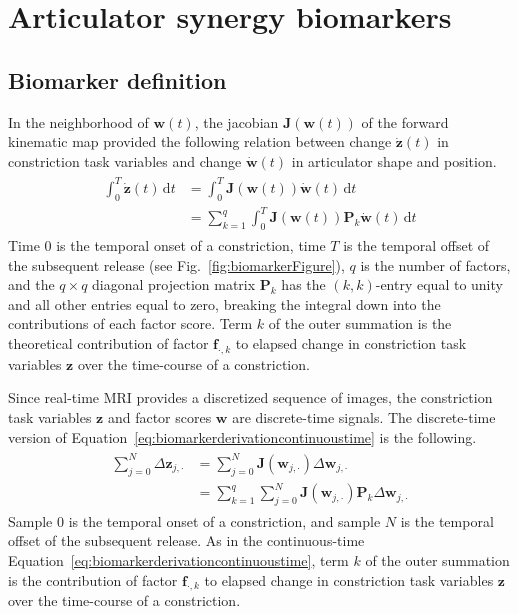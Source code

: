 \documentclass[reprint]{JASAnew}\usepackage[]{graphicx}\usepackage[]{color}
\begin{document}
\section{Articulator synergy biomarkers}
\label{sec:articulator_synergy_biomarker}

\subsection{Biomarker definition}

In the neighborhood of $\mathbf{w}(t)$, the jacobian $\mathbf{J}(\mathbf{w}(t))$ of the forward kinematic map provided the following relation between change $\mathbf{\dot{z}}(t)$ in constriction task variables and change $\mathbf{\dot{w}}(t)$ in articulator shape and position.
%
\begin{align}
\label{eq:biomarkerderivationcontinuoustime}
\begin{split}
\int_{0}^{T} \mathbf{\dot{z}}(t) \, \mathrm{d}t
	&= \int_{0}^{T} \mathbf{J}\left( \mathbf{w}(t) \right) \mathbf{\dot{w}}(t) \, \mathrm{d}t \\
    &= \sum_{k=1}^q \int_{0}^{T} \mathbf{J}\left( \mathbf{w}(t) \right) \mathbf{P}_k \mathbf{\dot{w}}(t) \, \mathrm{d}t
\end{split}
\end{align}
%
Time $0$ is the temporal onset of a constriction, time $T$ is the temporal offset of the subsequent release (see Fig.~\ref{fig:biomarkerFigure}), $q$ is the number of factors, and the $q\times q$ diagonal projection matrix $\mathbf{P}_k$ has the $(k,k)$-entry equal to unity and all other entries equal to zero, breaking the integral down into the contributions of each factor score.
Term $k$ of the outer summation is the theoretical contribution of factor $\mathbf{f}_{\cdot,k}$ to elapsed change in constriction task variables $\mathbf{z}$ over the time-course of a constriction. 

Since real-time MRI provides a discretized sequence of images, the constriction task variables $\mathbf{z}$ and factor scores $\mathbf{w}$ are discrete-time signals. 
%
The discrete-time version of Equation~\ref{eq:biomarkerderivationcontinuoustime} is the following.
%
\begin{align}
\label{eq:discretetimedeltaz}
\begin{split}
\sum_{j=0}^{N} \Delta \mathbf{z}_{j,\cdot}
	&= \sum_{j=0}^{N} \mathbf{J}\left( \mathbf{w}_{j,\cdot} \right) \Delta \mathbf{w}_{j,\cdot} \\
    &= \sum_{k=1}^q \sum_{j=0}^{N} \mathbf{J}\left( \mathbf{w}_{j,\cdot} \right) \mathbf{P}_k \Delta \mathbf{w}_{j,\cdot}
\end{split}
\end{align}
%
Sample $0$ is the temporal onset of a constriction, and sample $N$ is the temporal offset of the subsequent release.
%
As in the continuous-time Equation~\ref{eq:biomarkerderivationcontinuoustime}, term $k$ of the outer summation is the contribution of factor $\mathbf{f}_{\cdot,k}$ to elapsed change in constriction task variables $\mathbf{z}$ over the time-course of a constriction.
\end{document}
